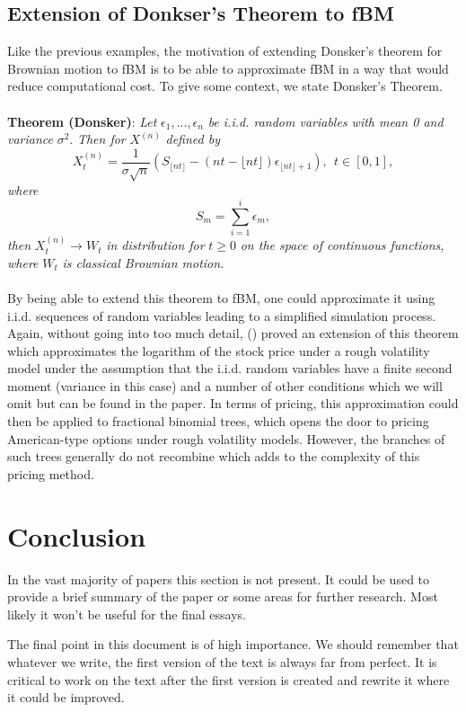 \documentclass[12pt,oneside]{article}
\begin{document}
\subsection{Extension of Donkser's Theorem to fBM}
Like the previous examples, the motivation of extending Donsker's theorem for Brownian motion to fBM is to be able to approximate fBM in a way that would reduce computational cost. To give some context,  we state Donsker's Theorem.
\\
\\
 \textbf{Theorem (Donsker)}: \textit{Let} $\epsilon_1,...,\epsilon_n$ \textit{be i.i.d. random variables with mean 0 and variance} $\sigma^2$. \textit{Then for} $X^{(n)}$ \textit{defined by} $$X_t^{(n)} = \frac{1}{\sigma \sqrt{n}} (S_{\lfloor nt \rfloor} - (nt - \lfloor nt \rfloor) \epsilon_{\lfloor nt \rfloor + 1}), \ \ t\in[0,1],$$ \textit{where} $$S_m = \sum_{i=1}^i \epsilon_m,$$ \textit{then} $X_t^{(n)} \rightarrow W_t$ \textit{in distribution for} $t\ge0$ \textit{on the space of continuous functions, where} $W_t$ \textit{is classical Brownian motion}.
\\
\\
By being able to extend this theorem to fBM, one could approximate it using i.i.d. sequences of random variables leading to a simplified simulation process. Again, without going into too much detail, (\cite{HORVATH}) proved an extension of this theorem which approximates the logarithm of the stock price under a rough volatility model under the assumption that the i.i.d. random variables have a finite second moment (variance in this case) and a number of other conditions which we will omit but can be found in the paper. In terms of pricing, this approximation could then be applied to fractional binomial trees, which opens the door to pricing American-type options under rough volatility models. However, the branches of such trees generally do not recombine which adds to the complexity of this pricing method.   

\section{Conclusion}
\label{sec:conclusion}
In the vast majority of papers this section is not present. It could be used to provide a brief summary of the paper or some areas for further research. Most likely it won't be useful for the final essays.

The final point in this document is of high importance. 
We should remember that whatever we write, the first version of the text is always far from perfect. 
It is critical to work on the text after the first version is created and rewrite it where it could be improved. 

\end{document}
